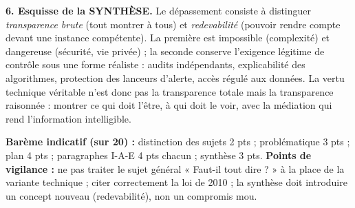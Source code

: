\documentclass[11pt]{article}
\begin{document}
\begin{corrige}
\textbf{6. Esquisse de la SYNTHÈSE.} Le dépassement consiste à distinguer \emph{transparence brute} (tout montrer à tous) et \emph{redevabilité} (pouvoir rendre compte devant une instance compétente). La première est impossible (complexité) et dangereuse (sécurité, vie privée) ; la seconde conserve l'exigence légitime de contrôle sous une forme réaliste : audits indépendants, explicabilité des algorithmes, protection des lanceurs d'alerte, accès régulé aux données. La vertu technique véritable n'est donc pas la transparence totale mais la transparence raisonnée : montrer ce qui doit l'être, à qui doit le voir, avec la médiation qui rend l'information intelligible.\par
\textbf{Barème indicatif (sur 20) :} distinction des sujets 2 pts ; problématique 3 pts ; plan 4 pts ; paragraphes I-A-E 4 pts chacun ; synthèse 3 pts.
\textbf{Points de vigilance :} ne pas traiter le sujet général « Faut-il tout dire ? » à la place de la variante technique ; citer correctement la loi de 2010 ; la synthèse doit introduire un concept nouveau (redevabilité), non un compromis mou.
\end{corrige}
\end{document}

